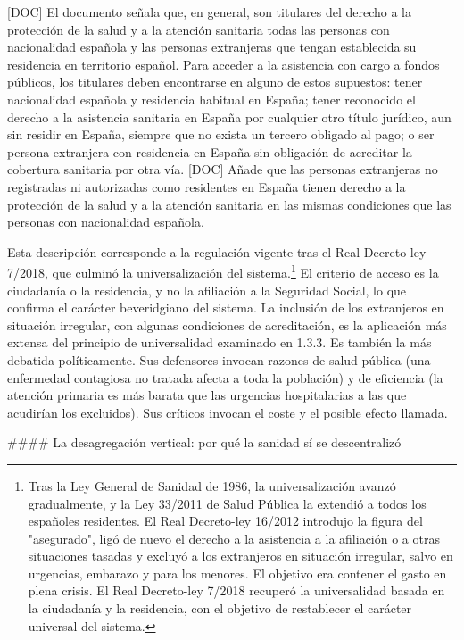\documentclass[10pt,a4paper]{article}
\begin{document}
[DOC] El documento señala que, en general, son titulares del derecho a la protección de la salud y a la atención sanitaria todas las personas con nacionalidad española y las personas extranjeras que tengan establecida su residencia en territorio español. Para acceder a la asistencia con cargo a fondos públicos, los titulares deben encontrarse en alguno de estos supuestos: tener nacionalidad española y residencia habitual en España; tener reconocido el derecho a la asistencia sanitaria en España por cualquier otro título jurídico, aun sin residir en España, siempre que no exista un tercero obligado al pago; o ser persona extranjera con residencia en España sin obligación de acreditar la cobertura sanitaria por otra vía. [DOC] Añade que las personas extranjeras no registradas ni autorizadas como residentes en España tienen derecho a la protección de la salud y a la atención sanitaria en las mismas condiciones que las personas con nacionalidad española.

Esta descripción corresponde a la regulación vigente tras el Real Decreto-ley 7/2018, que culminó la universalización del sistema.\footnote{%
    Tras la Ley General de Sanidad de 1986, la universalización avanzó gradualmente, y la Ley 33/2011 de Salud Pública la extendió a todos los españoles residentes. El Real Decreto-ley 16/2012 introdujo la figura del "asegurado", ligó de nuevo el derecho a la asistencia a la afiliación o a otras situaciones tasadas y excluyó a los extranjeros en situación irregular, salvo en urgencias, embarazo y para los menores. El objetivo era contener el gasto en plena crisis. El Real Decreto-ley 7/2018 recuperó la universalidad basada en la ciudadanía y la residencia, con el objetivo de restablecer el carácter universal del sistema.
} El criterio de acceso es la ciudadanía o la residencia, y no la afiliación a la Seguridad Social, lo que confirma el carácter beveridgiano del sistema. La inclusión de los extranjeros en situación irregular, con algunas condiciones de acreditación, es la aplicación más extensa del principio de universalidad examinado en 1.3.3. Es también la más debatida políticamente. Sus defensores invocan razones de salud pública (una enfermedad contagiosa no tratada afecta a toda la población) y de eficiencia (la atención primaria es más barata que las urgencias hospitalarias a las que acudirían los excluidos). Sus críticos invocan el coste y el posible efecto llamada.

#### La desagregación vertical: por qué la sanidad sí se descentralizó
\end{document}
